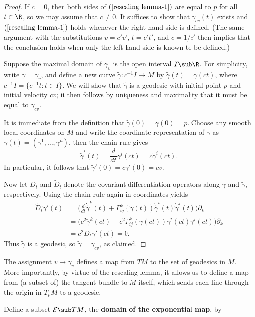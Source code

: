 \begin{proof}
If $c=0$, then both sides of $(\ref{rescaling lemma-1})$ are equal to $p$ for all $t\in\R$, so we may assume that $c\neq 0$. It suffices to show that $\gamma_{cv}(t)$ exists 
and $(\ref{rescaling lemma-1})$ holds whenever the right-hand side is defined. (The same argument with the substitutions $v=c'v'$, $t=c't'$, and $c=1/c'$ then implies that the conclusion holds when 
only the left-hand side is known to be defined.)\par
Suppose the maximal domain of $\gamma_v$ is the open interval $I\sub\R$. For simplicity, write $\gamma=\gamma_v$, and define a new curve $\tilde{\gamma}:c^{-1}I\to M$ 
by $\tilde{\gamma}(t)=\gamma(ct)$, where $c^{-1}I=\{c^{-1}t:t\in I\}$. We will show that $\tilde{\gamma}$ is a geodesic with initial point $p$ and initial velocity 
$cv$; it then follows by uniqueness and maximality that it must be equal to $\gamma_{cv}$.\par
It is immediate from the definition that $\tilde{\gamma}(0)=\gamma(0)=p$. Choose any smooth local coordinates on $M$ and write the coordinate representation of $\gamma$ 
as $\gamma(t)=(\gamma^1,\dots,\gamma^n)$, then the chain rule gives
\[\dot{\tilde{\gamma}}^i(t)=\frac{d}{dt}\gamma^i(ct)=c\dot{\gamma}^i(ct).\]
In particular, it follows that $\tilde{\gamma}'(0)=c\gamma'(0)=cv$.\par
Now let $D_t$ and $\widetilde{D}_t$ denote the covariant differentiation operators along $\gamma$ and $\tilde{\gamma}$, respectively. Using the chain rule again in 
coordinates yields
\begin{align*}
\widetilde{D}_t\tilde{\gamma}'(t)&=\Big(\frac{d}{dt}\dot{\tilde{\gamma}}^k(t)+\Gamma_{ij}^k(\tilde{\gamma}(t))\dot{\tilde{\gamma}}^i(t)\dot{\tilde{\gamma}}^j(t)\Big)\partial_k\\
&=\Big(c^2\ddot{\gamma}^k(ct)+c^2\Gamma_{ij}^k(\gamma(ct))\dot{\gamma}^i(ct)\dot{\gamma}^j(ct)\Big)\partial_k\\
&=c^2D_t\gamma'(ct)=0.
\end{align*}
Thus $\tilde{\gamma}$ is a geodesic, so $\tilde{\gamma}=\gamma_{cv}$, as claimed.
\end{proof}
The assignment $v\mapsto\gamma_v$ defines a map from $TM$ to the set of geodesics in $M$. More importantly, by virtue of the rescaling lemma, it allows us to define 
a map from (a subset of) the tangent bundle to $M$ itself, which sends each line through the origin in $T_pM$ to a geodesic.\par
Define a subset $\mathcal{E}\sub TM$, the \textbf{domain of the exponential map}, by
